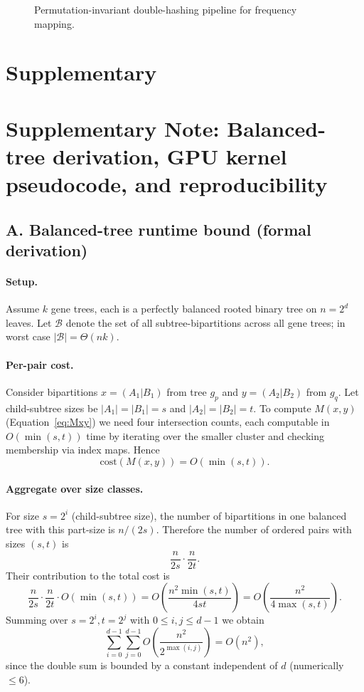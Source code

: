 \documentclass[10pt,a4paper]{article}
\begin{document}
\begin{enumerate}
\begin{figure}[t]
\begin{tikzpicture}[node distance=7mm, every node/.style={font=\small}]
\end{tikzpicture}
\caption{Permutation-invariant double-hashing pipeline for frequency mapping.}
\label{fig:doublehash}
\end{figure}


\section{Supplementary}

\section*{Supplementary Note: Balanced-tree derivation, GPU kernel pseudocode, and reproducibility}

\subsection*{A. Balanced-tree runtime bound (formal derivation)}

\paragraph{Setup.}
Assume $k$ gene trees, each is a perfectly balanced rooted binary tree on $n=2^d$ leaves. Let $\mathcal{B}$ denote the set of all subtree-bipartitions across all gene trees; in worst case $|\mathcal{B}|=\Theta(nk)$.

\paragraph{Per-pair cost.}
Consider bipartitions $x=(A_1|B_1)$ from tree $g_p$ and $y=(A_2|B_2)$ from $g_q$. Let child-subtree sizes be $|A_1|=|B_1|=s$ and $|A_2|=|B_2|=t$. To compute $M(x,y)$ (Equation~\eqref{eq:Mxy}) we need four intersection counts, each computable in $O(\min(s,t))$ time by iterating over the smaller cluster and checking membership via index maps. Hence
\[
\mathrm{cost}(M(x,y)) = O(\min(s,t)).
\]

\paragraph{Aggregate over size classes.}
For size $s=2^i$ (child-subtree size), the number of bipartitions in one balanced tree with this part-size is $n/(2s)$. Therefore the number of ordered pairs with sizes $(s,t)$ is
\[
\frac{n}{2s}\cdot\frac{n}{2t}.
\]
Their contribution to the total cost is
\[
\frac{n}{2s}\cdot\frac{n}{2t}\cdot O(\min(s,t)) = O\!\left(\frac{n^2\min(s,t)}{4st}\right) = O\!\left(\frac{n^2}{4\max(s,t)}\right).
\]
Summing over $s=2^i, t=2^j$ with $0\le i,j\le d-1$ we obtain
\[
\sum_{i=0}^{d-1}\sum_{j=0}^{d-1} O\!\left(\frac{n^2}{2^{\max(i,j)}}\right) = O(n^2),
\]
since the double sum is bounded by a constant independent of $d$ (numerically $\le 6$).


\end{enumerate}
\end{document}
